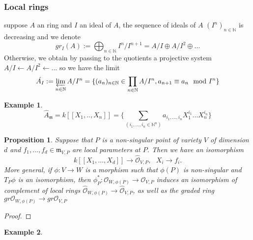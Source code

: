 \documentclass[12pt,a4paper,english]{article}
\theoremstyle{plain}
\newtheorem{prop}[thm]{Proposition}
\theoremstyle{definition}
\newtheorem*{example}{Example}
\theoremstyle{remark}
\begin{document}
\subsubsection{Local rings}
suppose $A$ an ring and $I$ an ideal of $A $, the sequence of ideals of $A$ $(I^{n})_{n\in\mathbb{N}}$ is decreasing and we denote 
\begin{equation*}
    gr_{I}(A):=\bigoplus_{n\in\mathbb{N}}I^{n}/I^{n+1}=A/I\oplus A/I^{2}\oplus... 
\end{equation*}
Otherwise, we obtain by passing to the quotients a projective system $A/I\leftarrow A/I^{2}\leftarrow...
$ so we have the limit
\begin{equation*}
    \hat{A_{I}}:=\varprojlim_{n\in\mathbb{N}}A/I^{n}=\{(a_{n})_{n\in\mathbb{N}}\in \prod_{n\in\mathbb{N}}A/I^{n}, a_{n+1}\equiv a_{n}\mod I^{n}\}
\end{equation*}


\begin{example}
\begin{equation*}
    \hat{A}_{\mathfrak{m}}=k[[X_{1},..,X_{n}]]=\{\sum_{(i_{1},...,i_{n}\in\mathbb{N}^{n})}a_{i_{1},...,i_{n}}X^{i_{1}}_{1}...X^{i_{n}}_{n}\}
\end{equation*}
\end{example}
\begin{prop}
Suppose that $P$ is a non-singular point of variety $V$ of dimension $d$ and $f_{1},...,f_{d}\in \mathfrak{m}_{V,P}$ are local parameters at $P$. Then we have an isomorphism
\begin{equation*}
    k[[X_{1},...,X_{d}]]\rightarrow \hat{\mathcal{O}}_{V,P},\ \ \ X_{i}\rightarrow f_{i}.
\end{equation*}
More general, if $\phi:V\rightarrow W$ is a morphism such that $\phi(P)$ is non-singular and $T_{P}\phi$ is an isomorphism, then $\phi^{*}_{P}:\mathcal{O}_{W,\phi(P)}\rightarrow \mathcal{O}_{V, P}$ induces an isomorphism of complement of local rings $\hat{\mathcal{O}}_{W,\phi(P)}\rightarrow \hat{\mathcal{O}}_{V,P}$, as well as the graded ring $gr\mathcal{O}_{W,\phi(P)}\rightarrow gr\mathcal{O}_{V,P  }$
\end{prop}

\begin{proof}


\end{proof}
\begin{example}

\end{example}
\end{document}
